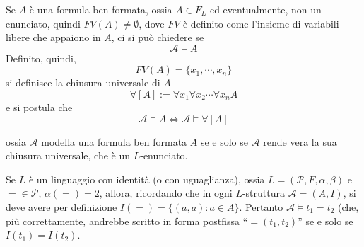 \begin{defi}
Se $A$ è una formula ben formata, ossia $A \in F_L$ ed eventualmente,
non un enunciato, quindi $FV(A) \neq \emptyset$, dove $FV$ è definito come l'insieme 
di variabili libere che appaiono in $A$, ci si può chiedere se 
$$ 
\mathcal{A} \models A
$$
Definito, quindi, 
$$
FV(A) = \{x_1, \cdots, x_n\} 
$$
si definisce la chiusura universale di $A$ 
$$
\forall[A] := \forall x_1 \forall x_2 \cdots \forall x_n A
$$
e si postula che
$$
\mathcal{A} \models A \iff \mathcal{A} \models \forall[A]
$$
\end{defi}
ossia $\mathcal{A}$ modella una formula ben formata $A$ se e solo se 
$\mathcal{A}$ rende vera la sua chiusura universale, che è un $L$-enunciato.

\begin{oss}
        Se $L$ è un linguaggio con identità (o con uguaglianza), ossia 
        $L = (\mathcal{P}, F, \alpha, \beta)$ e $= \in \mathcal{P}$, 
        $\alpha(=) = 2$, 
        allora, ricordando che in ogni $L$-struttura $\mathcal{A} = (A,I)$, 
        si deve avere per definizione $I(=) = \{(a,a) : a \in A\}$. 
        Pertanto $\mathcal{A} \models t_1 = t_2$ (che, più correttamente, 
        andrebbe scritto in forma postfissa ``$=(t_1, t_2)$'' se e solo se 
        $I(t_1) = I(t_2)$. 
\end{oss}

